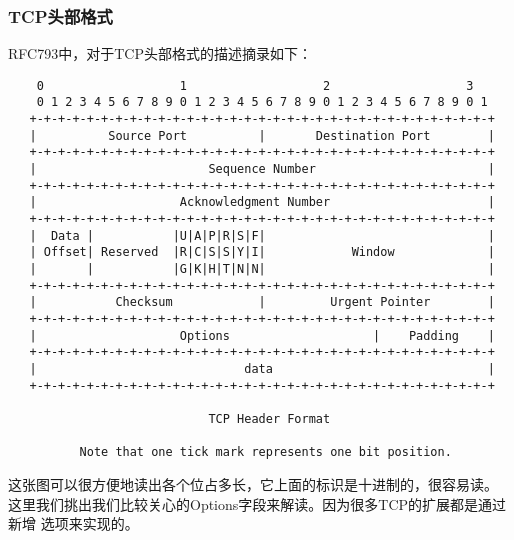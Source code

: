 \subsubsection{TCP头部格式}
\label{RFC793TCPHeader:tcp_header_format}
RFC793中，对于TCP头部格式的描述摘录如下：
\begin{verbatim}
    0                   1                   2                   3   
    0 1 2 3 4 5 6 7 8 9 0 1 2 3 4 5 6 7 8 9 0 1 2 3 4 5 6 7 8 9 0 1 
   +-+-+-+-+-+-+-+-+-+-+-+-+-+-+-+-+-+-+-+-+-+-+-+-+-+-+-+-+-+-+-+-+
   |          Source Port          |       Destination Port        |
   +-+-+-+-+-+-+-+-+-+-+-+-+-+-+-+-+-+-+-+-+-+-+-+-+-+-+-+-+-+-+-+-+
   |                        Sequence Number                        |
   +-+-+-+-+-+-+-+-+-+-+-+-+-+-+-+-+-+-+-+-+-+-+-+-+-+-+-+-+-+-+-+-+
   |                    Acknowledgment Number                      |
   +-+-+-+-+-+-+-+-+-+-+-+-+-+-+-+-+-+-+-+-+-+-+-+-+-+-+-+-+-+-+-+-+
   |  Data |           |U|A|P|R|S|F|                               |
   | Offset| Reserved  |R|C|S|S|Y|I|            Window             |
   |       |           |G|K|H|T|N|N|                               |
   +-+-+-+-+-+-+-+-+-+-+-+-+-+-+-+-+-+-+-+-+-+-+-+-+-+-+-+-+-+-+-+-+
   |           Checksum            |         Urgent Pointer        |
   +-+-+-+-+-+-+-+-+-+-+-+-+-+-+-+-+-+-+-+-+-+-+-+-+-+-+-+-+-+-+-+-+
   |                    Options                    |    Padding    |
   +-+-+-+-+-+-+-+-+-+-+-+-+-+-+-+-+-+-+-+-+-+-+-+-+-+-+-+-+-+-+-+-+
   |                             data                              |
   +-+-+-+-+-+-+-+-+-+-+-+-+-+-+-+-+-+-+-+-+-+-+-+-+-+-+-+-+-+-+-+-+

                            TCP Header Format

          Note that one tick mark represents one bit position.
\end{verbatim}

这张图可以很方便地读出各个位占多长，它上面的标识是十进制的，很容易读。
这里我们挑出我们比较关心的Options字段来解读。因为很多TCP的扩展都是通过新增
选项来实现的。

